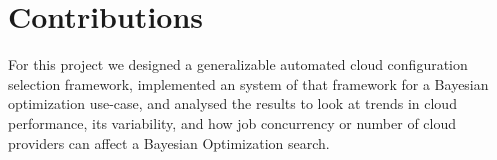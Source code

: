 \documentclass{report}
\begin{document}
%

\section{Contributions}
For this project we designed a generalizable automated cloud configuration selection framework, implemented an system of that framework for a Bayesian optimization use-case, and analysed the results to look at trends in cloud performance, its variability, and how job concurrency or number of cloud providers can affect a Bayesian Optimization search.
\end{document}
